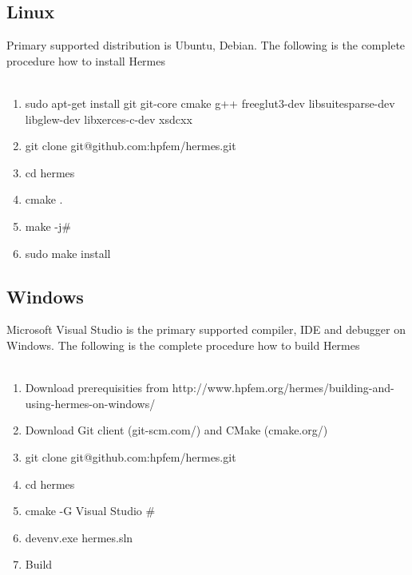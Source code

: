 \documentclass{beamer}
\begin{document}
\subsection{Linux}
\begin{frame}
Primary supported distribution is Ubuntu, Debian. The following is the complete procedure how to install Hermes\ \\ \ \\
	\begin{enumerate}
		\item sudo apt-get install git git-core cmake g++ freeglut3-dev libsuitesparse-dev libglew-dev libxerces-c-dev xsdcxx
		\item git clone git@github.com:hpfem/hermes.git
		\item cd hermes
		\item cmake .
		\item make -j\#
		\item sudo make install
	\end{enumerate}
\end{frame}

\subsection{Windows}
\begin{frame}
Microsoft Visual Studio is the primary supported compiler, IDE and debugger on Windows. The following is the complete procedure how to build Hermes\ \\ \ \\
	\begin{enumerate}
		\item Download prerequisities from http://www.hpfem.org/hermes/building-and-using-hermes-on-windows/
		\item Download Git client (git-scm.com/) and CMake (cmake.org/)
		\item git clone git@github.com:hpfem/hermes.git
		\item cd hermes
		\item cmake -G Visual Studio \#
		\item devenv.exe hermes.sln
		\item Build
	\end{enumerate}
\end{frame}
\end{document}
